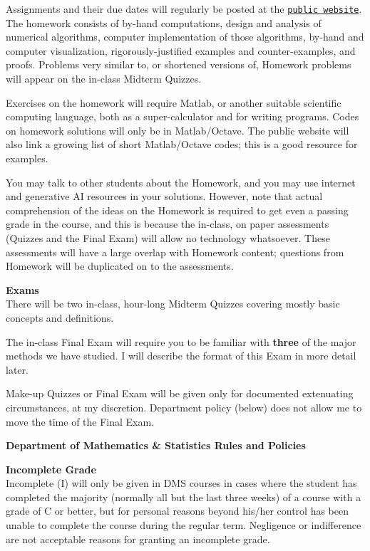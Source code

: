 \documentclass[12pt]{article}
\renewcommand{\emph}[1]{\textsf{\textbf{#1}}}
\newcommand{\localhead}[1]{\par\smallskip\textbf{#1} \smallskip\nobreak\\}%
\def\heading#1{\localhead{\large\emph{#1}}}
\def\subheading#1{\localhead{\emph{#1}}}
\begin{document}
Assignments and their due dates will regularly be posted at the \href{https://bueler.github.io/nla/}{\texttt{public website}}.  The homework consists of by-hand computations, design and analysis of numerical algorithms, computer implementation of those algorithms, by-hand and computer visualization, rigorously-justified examples and counter-examples, and proofs.  Problems very similar to, or shortened versions of, Homework problems will appear on the in-class Midterm Quizzes.

Exercises on the homework will require Matlab, or another suitable scientific computing language, both as a super-calculator and for writing programs.  Codes on homework solutions will only be in Matlab/Octave.  The public website will also link a growing list of short Matlab/Octave codes; this is a good resource for examples.

You may talk to other students about the Homework, and you may use internet and generative AI resources in your solutions.  However, note that actual comprehension of the ideas on the Homework is required to get even a passing grade in the course, and this is because the in-class, on paper assessments (Quizzes and the Final Exam) will allow no technology whatsoever.  These assessments will have a large overlap with Homework content; questions from Homework will be duplicated on to the assessments.

\heading{Exams}
There will be two in-class, hour-long Midterm Quizzes covering mostly basic concepts and definitions.

The in-class Final Exam will require you to be familiar with \textbf{three} of the major methods we have studied.  I will describe the format of this Exam in more detail later.

Make-up Quizzes or Final Exam will be given only for documented extenuating circumstances, at my discretion.  Department policy (below) does not allow me to move the time of the Final Exam.


\phantom{foo}

\heading{Department of Mathematics \& Statistics Rules and Policies}
\vskip -20pt

\subheading{Incomplete Grade} 
Incomplete (I) will only be given in
  DMS courses in cases where
  the student has completed the majority (normally all but the last
  three weeks) of a course with a grade of C or better, but for
  personal reasons beyond his/her control has been unable to complete
  the course during the regular term. Negligence or indifference are
  not acceptable reasons for granting an incomplete grade.
\end{document}
